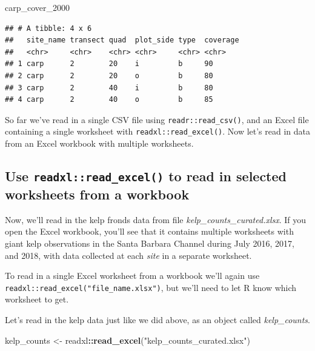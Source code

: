 \documentclass[]{book}
\newenvironment{Shaded}{\begin{snugshade}}{\end{snugshade}}
\newcommand{\DecValTok}[1]{\textcolor[rgb]{0.00,0.00,0.81}{#1}}
\newcommand{\KeywordTok}[1]{\textcolor[rgb]{0.13,0.29,0.53}{\textbf{#1}}}
\newcommand{\NormalTok}[1]{#1}
\newcommand{\OperatorTok}[1]{\textcolor[rgb]{0.81,0.36,0.00}{\textbf{#1}}}
\newcommand{\StringTok}[1]{\textcolor[rgb]{0.31,0.60,0.02}{#1}}
\begin{document}
\begin{Shaded}
\begin{Highlighting}[]
\NormalTok{carp_cover_}\DecValTok{2000}
\end{Highlighting}
\end{Shaded}

\begin{verbatim}
## # A tibble: 4 x 6
##   site_name transect quad  plot_side type  coverage
##   <chr>     <chr>    <chr> <chr>     <chr> <chr>   
## 1 carp      2        20    i         b     90      
## 2 carp      2        20    o         b     80      
## 3 carp      2        40    i         b     80      
## 4 carp      2        40    o         b     85
\end{verbatim}

So far we've read in a single CSV file using \texttt{readr::read\_csv()}, and an Excel file containing a single worksheet with \texttt{readxl::read\_excel()}. Now let's read in data from an Excel workbook with multiple worksheets.

\hypertarget{use-readxlread_excel-to-read-in-selected-worksheets-from-a-workbook}{%
\subsection{\texorpdfstring{Use \texttt{readxl::read\_excel()} to read in selected worksheets from a workbook}{Use readxl::read\_excel() to read in selected worksheets from a workbook}}\label{use-readxlread_excel-to-read-in-selected-worksheets-from-a-workbook}}

Now, we'll read in the kelp fronds data from file \emph{kelp\_counts\_curated.xlsx}. If you open the Excel workbook, you'll see that it contains multiple worksheets with giant kelp observations in the Santa Barbara Channel during July 2016, 2017, and 2018, with data collected at each \emph{site} in a separate worksheet.

To read in a single Excel worksheet from a workbook we'll again use \texttt{readxl::read\_excel("file\_name.xlsx")}, but we'll need to let R know which worksheet to get.

Let's read in the kelp data just like we did above, as an object called \emph{kelp\_counts}.

\begin{Shaded}
\begin{Highlighting}[]
\NormalTok{kelp_counts <-}\StringTok{ }\NormalTok{readxl}\OperatorTok{::}\KeywordTok{read_excel}\NormalTok{(}\StringTok{"kelp_counts_curated.xlsx"}\NormalTok{)}
\end{Highlighting}
\end{Shaded}
\end{document}
